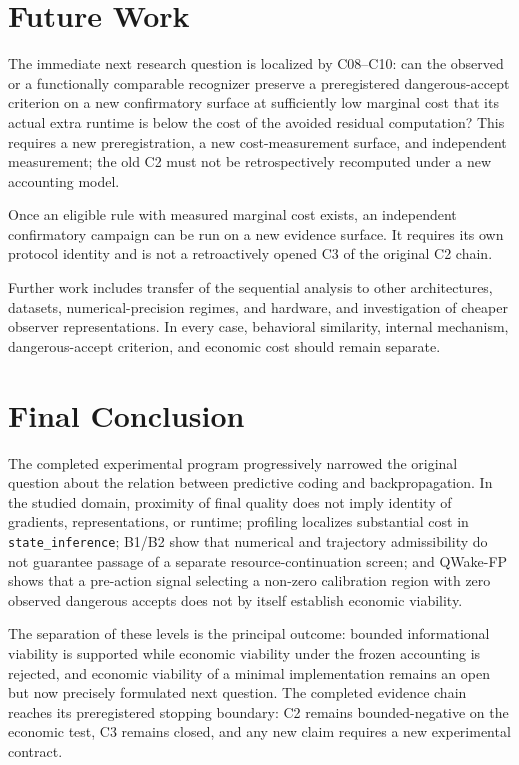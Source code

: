 \section{Future Work}

The immediate next research question is localized by C08--C10: can the observed or a
functionally comparable recognizer preserve a preregistered dangerous-accept criterion
on a new confirmatory surface at sufficiently low marginal cost that its actual extra
runtime is below the cost of the avoided residual computation? This requires a new
preregistration, a new cost-measurement surface, and independent measurement; the old
C2 must not be retrospectively recomputed under a new accounting model.

Once an eligible rule with measured marginal cost exists, an independent confirmatory
campaign can be run on a new evidence surface. It requires its own protocol identity
and is not a retroactively opened C3 of the original C2 chain.

Further work includes transfer of the sequential analysis to other architectures,
datasets, numerical-precision regimes, and hardware, and investigation of cheaper
observer representations. In every case, behavioral similarity, internal mechanism,
dangerous-accept criterion, and economic cost should remain separate.

\section{Final Conclusion}

The completed experimental program progressively narrowed the original question about
the relation between predictive coding and backpropagation. In the studied domain,
proximity of final quality does not imply identity of gradients, representations, or
runtime; profiling localizes substantial cost in \texttt{state\_inference}; B1/B2 show
that numerical and trajectory admissibility do not guarantee passage of a separate
resource-continuation screen; and QWake-FP shows that a pre-action signal selecting a
non-zero calibration region with zero observed dangerous accepts does not by itself
establish economic viability.

The separation of these levels is the principal outcome: bounded informational
viability is supported while economic viability under the frozen accounting is
rejected, and economic viability of a minimal implementation remains an open but now
precisely formulated next question. The completed evidence chain reaches its
preregistered stopping boundary: C2 remains bounded-negative on the economic test, C3
remains closed, and any new claim requires a new experimental contract.
